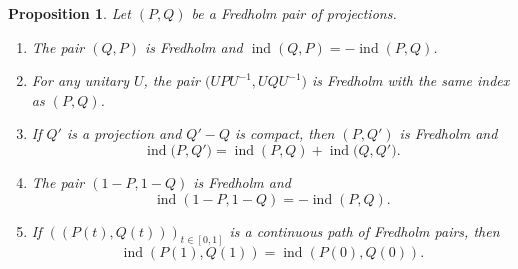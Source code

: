 \documentclass[pdftex]{sigma}
\numberwithin{equation}{section}
\newtheorem{Proposition}[Theorem]{Proposition}
\DeclareMathOperator{\ind}{ind}
\begin{document}
	 \begin{Proposition}
		\label{Fredholmprops}
		Let $(P,Q)$ be a Fredholm pair of projections.
		\begin{enumerate}\itemsep=0pt
			\item[$(1)$] The pair $(Q,P)$ is Fredholm and $\ind(Q,P)=-\ind(P,Q)$.
			\item[$(2)$] For any unitary $U$, the pair $\bigl(UPU^{-1}, UQU^{-1}\bigr)$ is Fredholm with the same index as $(P,Q)$.
			\item[$(3)$] If $Q'$ is a projection and $Q'-Q$ is compact, then $(P,Q')$ is Fredholm and
			\[\ind\bigl(P,Q'\bigr)=\ind(P,Q)+\ind\bigl(Q,Q'\bigr).\]
			\item[$(4)$] The pair $(1-P,1-Q)$ is Fredholm and
			\[\ind(1-P,1-Q)=-\ind(P,Q).\]
			\item[$(5)$] If $((P(t),Q(t)))_{t\in [0,1]}$ is a continuous path of Fredholm pairs, then
			\[\ind(P(1),Q(1))=\ind(P(0),Q(0)).\]
    \end{enumerate}
		\end{Proposition}
	
\end{document}
